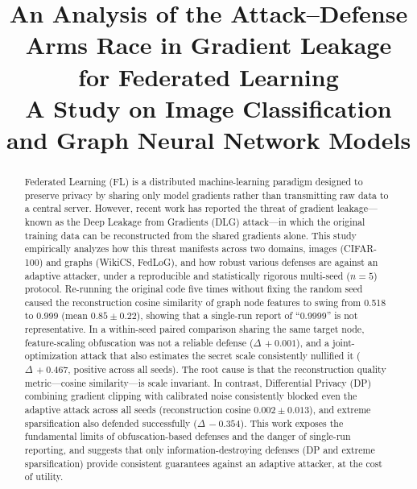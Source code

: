 \documentclass[conference]{IEEEtran}
\begin{document}
\title{An Analysis of the Attack--Defense Arms Race in Gradient Leakage for
Federated Learning\\
{\normalsize A Study on Image Classification and Graph Neural Network Models}}

\author{
}

\maketitle

\begin{abstract}
Federated Learning (FL) is a distributed machine-learning paradigm designed to
preserve privacy by sharing only model gradients rather than transmitting raw
data to a central server. However, recent work has reported the threat of
gradient leakage---known as the Deep Leakage from Gradients (DLG) attack---in
which the original training data can be reconstructed from the shared gradients
alone. This study empirically analyzes how this threat manifests across two
domains, images (CIFAR-100) and graphs (WikiCS, FedLoG), and how robust various
defenses are against an adaptive attacker, under a reproducible and
statistically rigorous multi-seed ($n{=}5$) protocol. Re-running the original
code five times without fixing the random seed caused the reconstruction cosine
similarity of graph node features to swing from 0.518 to 0.999 (mean
$0.85\pm0.22$), showing that a single-run report of ``0.9999'' is not
representative. In a within-seed paired comparison sharing the same target node,
feature-scaling obfuscation was not a reliable defense ($\Delta\,{+}0.001$), and
a joint-optimization attack that also estimates the secret scale consistently
nullified it ($\Delta\,{+}0.467$, positive across all seeds). The root cause is
that the reconstruction quality metric---cosine similarity---is scale invariant.
In contrast, Differential Privacy (DP) combining gradient clipping with
calibrated noise consistently blocked even the adaptive attack across all seeds
(reconstruction cosine $0.002\pm0.013$), and extreme sparsification also
defended successfully ($\Delta\,{-}0.354$). This work exposes the fundamental
limits of obfuscation-based defenses and the danger of single-run reporting, and
suggests that only information-destroying defenses (DP and extreme
sparsification) provide consistent guarantees against an adaptive attacker, at
the cost of utility.
\end{abstract}
\end{document}
